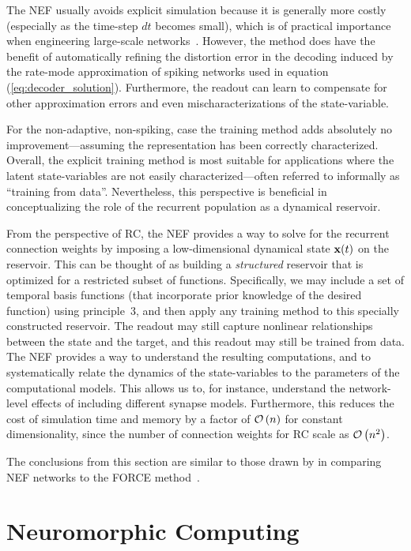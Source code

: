 The NEF usually avoids explicit simulation because it is generally more costly (especially as the time-step $dt$ becomes small), which is of practical importance when engineering large-scale networks~\citep[e.g.,][]{eliasmith2012large}.
However, the method does have the benefit of automatically refining the distortion error in the decoding induced by the rate-mode approximation of spiking networks used in equation (\ref{eq:decoder_solution}).
Furthermore, the readout can learn to compensate for other approximation errors and even mischaracterizations of the state-variable.

For the non-adaptive, non-spiking, case the training method adds absolutely no improvement---assuming the representation has been correctly characterized.
Overall, the explicit training method is most suitable for applications where the latent state-variables are not easily characterized---often referred to informally as ``training from data''.
Nevertheless, this perspective is beneficial in conceptualizing the role of the recurrent population as a dynamical reservoir.

From the perspective of RC, the NEF provides a way to solve for the recurrent connection weights by imposing a low-dimensional dynamical state $\mathbf{x}(t)$ on the reservoir.
This can be thought of as building a  \emph{structured} reservoir that is optimized for a restricted subset of functions.
Specifically, we may include a set of temporal basis functions (that incorporate prior knowledge of the desired function) using principle~3, and then apply any training method to this specially constructed reservoir.
The readout may still capture nonlinear relationships between the state and the target, and this readout may still be trained from data.
The NEF provides a way to understand the resulting computations, and to systematically relate the dynamics of the state-variables to the parameters of the computational models.
This allows us to, for instance, understand the network-level effects of including different synapse models.
Furthermore, this reduces the cost of simulation time and memory by a factor of $\mathcal{O}\left({ n }\right)$ for constant dimensionality, since the number of connection weights for RC scale as $\mathcal{O}\left({ n^2 }\right)$.

The conclusions from this section are similar to those drawn by \citet[][see supplementary~S1]{nicola2016supervised} in comparing NEF networks to the FORCE method~\citep{sussillo2009generating, abbott2016building}.


\section{Neuromorphic Computing}

